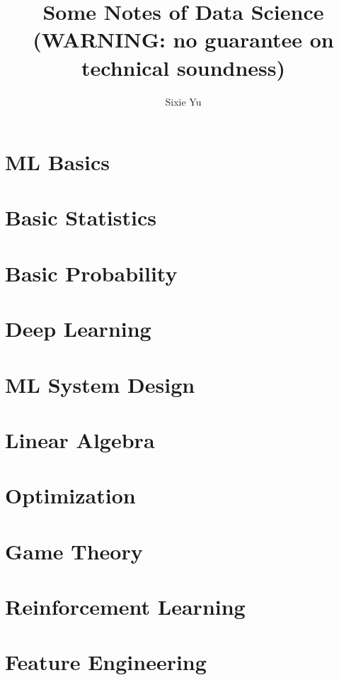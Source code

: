 \documentclass{article}
\title{Some Notes of Data Science \\ (WARNING: no guarantee on technical soundness)}
\author{Sixie Yu}
\date{ }
\begin{document}
\maketitle
\tableofcontents

\section{ML Basics}



\section{Basic Statistics}



\section{Basic Probability}
 

\section{Deep Learning}


\section{ML System Design}


\section{Linear Algebra}



\section{Optimization}



\section{Game Theory}



\section{Reinforcement Learning}



\section{Feature Engineering}

\end{document}
